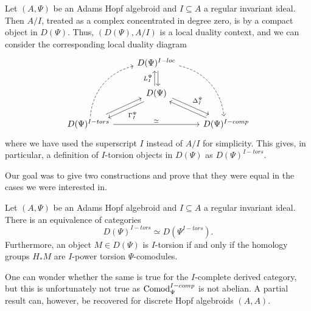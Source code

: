 \begin{construction}
    \label{ch0:const:local-duality-hopf-algebroid}
    Let $(A, \Psi)$ be an Adams Hopf algebroid and $I\subseteq A$ a regular invariant ideal. Then $A/I$, treated as a complex concentrated in degree zero, is by \cite[5.13]{barthel-heard-valenzuela_2018} a compact object in $D(\Psi)$. Thus, $(D(\Psi), A/I)$ is a local duality context, and we can consider the corresponding local duality diagram
    \begin{equation*}
        \begin{tikzcd}
            & {D(\Psi)^{I-loc}} \\
            & {D(\Psi)} \\
            {D(\Psi)^{I-tors}} && {D(\Psi)^{I-comp}}
            \arrow["L_I^\Psi", xshift=-2pt, from=2-2, to=1-2]
            \arrow[xshift=2pt, from=1-2, to=2-2]
            \arrow["\Delta_I^\Psi", yshift=2pt, xshift=2pt, from=2-2, to=3-3]
            \arrow[yshift=-2pt, xshift=-1pt, from=3-3, to=2-2]
            \arrow["\Gamma^\Psi_I", yshift=-2pt, xshift=2pt, from=2-2, to=3-1]
            \arrow[yshift=2pt, xshift=-1pt, from=3-1, to=2-2]
            \arrow[bend left=35, dashed, from=3-1, to=1-2]
            \arrow[bend left=35, dashed, from=1-2, to=3-3]
            \arrow["\simeq"', swap, from=3-1, to=3-3]
        \end{tikzcd}    
    \end{equation*}
    where we have used the superscript $I$ instead of $A/I$ for simplicity. This gives, in particular, a definition of $I$-torsion objects in $D(\Psi)$ as $D(\Psi)^{I-tors}$. 
\end{construction}

Our goal was to give two constructions and prove that they were equal in the cases we were interested in. 

\begin{lemma}
    \label{ch0:lm:derived-torsion-if-homology-torsion}
    Let $(A,\Psi)$ be an Adams Hopf algebroid and $I\subseteq A$ a regular invariant ideal. There is an equivalence of categories 
    $$D(\Psi)^{I-tors}\simeq D(\Psi^{I-tors}).$$ 
    Furthermore, an object $M\in D(\Psi)$ is $I$-torsion if and only if the homology groups $H_* M$ are $I$-power torsion $\Psi$-comodules.
\end{lemma}

\begin{remark}
    \label{ch0:rm:right-completed-derived-category}
    One can wonder whether the same is true for the $I$-complete derived category, but this is unfortunately not true as $\mathrm{Comod}_\Psi^{I-comp}$ is not abelian. A partial result can, however, be recovered for discrete Hopf algebroids $(A, A)$. 
\end{remark}

